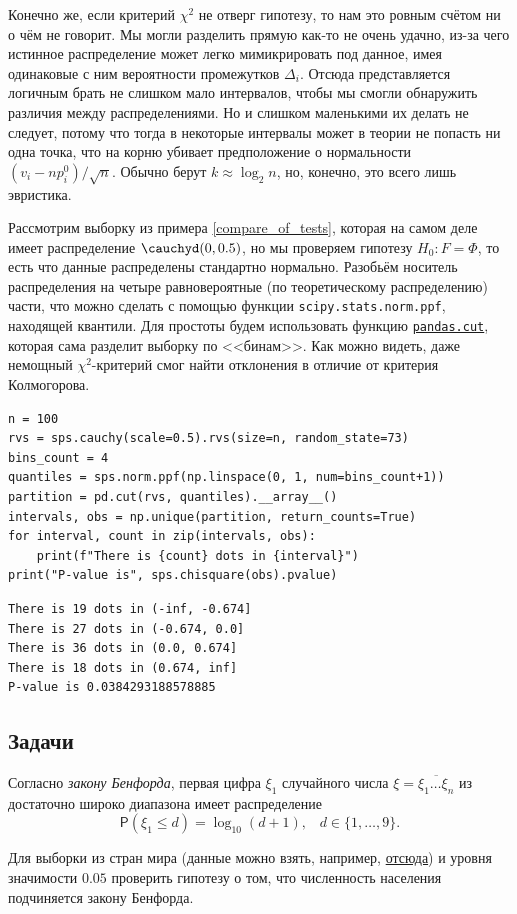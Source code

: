 Конечно же, если критерий $\chi^2$ не отверг гипотезу, то нам это ровным счётом ни о чём не говорит. Мы могли разделить прямую как-то не очень удачно, из-за чего истинное распределение может легко мимикрировать под данное, имея одинаковые с ним вероятности промежутков $\Delta_i$. Отсюда представляется логичным брать не слишком мало интервалов, чтобы мы смогли обнаружить различия между распределениями. Но и слишком маленькими их делать не следует, потому что тогда в некоторые интервалы может в теории не попасть ни одна точка, что на корню убивает предположение о нормальности $(v_i - np^0_i)/\sqrt{n}$. Обычно берут $k \approx \log_2{n}$, но, конечно, это всего лишь эвристика.

\begin{example}
    Рассмотрим выборку из примера \ref{compare_of_tests}, которая на самом деле имеет распределение $\cauchyd(0, 0.5)$, но мы проверяем гипотезу $H_0\colon F = \Phi$, то есть что данные распределены стандартно нормально. Разобьём носитель распределения на четыре равновероятные (по теоретическому распределению) части, что можно сделать с помощью функции \texttt{scipy.stats.norm.ppf}, находящей квантили. Для простоты будем использовать функцию \href{https://pandas.pydata.org/pandas-docs/stable/reference/api/pandas.cut.html}{\texttt{pandas.cut}}, которая сама разделит выборку по <<бинам>>. Как можно видеть, даже немощный $\chi^2$-критерий смог найти отклонения в отличие от критерия Колмогорова.
    \begin{verbatim}
n = 100
rvs = sps.cauchy(scale=0.5).rvs(size=n, random_state=73)
bins_count = 4
quantiles = sps.norm.ppf(np.linspace(0, 1, num=bins_count+1))
partition = pd.cut(rvs, quantiles).__array__()
intervals, obs = np.unique(partition, return_counts=True)
for interval, count in zip(intervals, obs):
    print(f"There is {count} dots in {interval}")
print("P-value is", sps.chisquare(obs).pvalue)
    \end{verbatim}
    \begin{lstlisting}
There is 19 dots in (-inf, -0.674]
There is 27 dots in (-0.674, 0.0]
There is 36 dots in (0.0, 0.674]
There is 18 dots in (0.674, inf]
P-value is 0.0384293188578885
    \end{lstlisting}
\end{example}

\subsection*{Задачи}

\begin{problem}
	Согласно \textit{закону Бенфорда}, первая цифра $\xi_1$ случайного числа $\xi = \overline{\xi_1 \ldots \xi_n}$ из достаточно широко диапазона имеет распределение
	\[
	\mathsf{P}(\xi_1 \le d) = \log_{10}{(d+1)}, \;\;\; d \in \{1, \ldots, 9\}.
	\]
	
	Для выборки из стран мира (данные можно взять, например, \href{https://www.kaggle.com/datasets/tanuprabhu/population-by-country-2020/data}{отсюда}) и уровня значимости $0.05$ проверить гипотезу о том, что численность населения подчиняется закону Бенфорда.
\end{problem}

